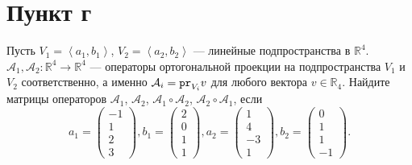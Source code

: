 \documentclass[12pt]{article}
\begin{document}
    \section*{Пункт г}
    Пусть $V_1 = \left < a_1, b_1 \right >$, $V_2 = \left < a_2, b_2 \right >$ --- линейные подпространства в $\mathbb{R}^4$.
    $\mathcal{A}_1, \mathcal{A}_2: \mathbb{R}^4 \rightarrow \mathbb{R}^4$ --- операторы ортогональной проекции на подпространства $V_1$ и $V_2$ соответственно, а именно
    $\mathcal{A}_i = \texttt{pr}_{V_i} {v}$ для любого вектора $v \in \mathbb{R}_4$. Найдите матрицы операторов $\mathcal{A}_1$, $\mathcal{A}_2$, $\mathcal{A}_1 \circ \mathcal{A}_2$,
    $\mathcal{A}_2 \circ \mathcal{A}_1$, если
    \[
        a_1 = \begin{pmatrix}
                  -1 \\ 1 \\ 2 \\ 3
        \end{pmatrix} ,
        b_1 = \begin{pmatrix}
                  2 \\ 0 \\ 1 \\ 1
        \end{pmatrix} ,
        a_2 = \begin{pmatrix}
                  1 \\ 4 \\ -3 \\ 1
        \end{pmatrix} ,
        b_2 = \begin{pmatrix}
                  0 \\ 1 \\ 1 \\ -1
        \end{pmatrix} .
    \]
\end{document}
